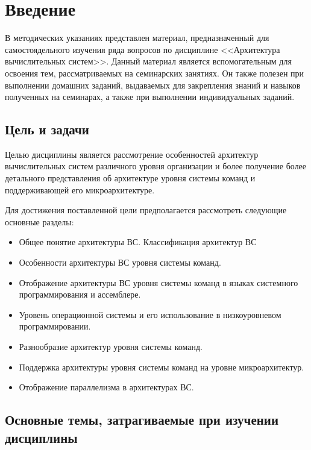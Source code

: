 
\chapter* {Введение}

В методических указаниях представлен материал, предназначенный для самостоядельного изучения ряда вопросов по дисциплине <<Архитектура вычислительных систем>>. Данный материал является вспомогательным для освоения тем, рассматриваемых на семинарских занятиях. Он также полезен при выполнении домашних заданий, выдаваемых для закрепления знаний и навыков полученных на семинарах, а также при выполнении индивидуальных заданий.

\section*{Цель и задачи}

Целью дисциплины является рассмотрение особенностей архитектур вычислительных систем различного уровня организации и более получение более детального представления об архитектуре уровня системы команд и поддерживающей его микроархитектуре.

Для достижения поставленной цели предполагается рассмотреть следующие основные разделы:

\begin{itemize}
 \item Общее понятие архитектуры ВС. Классификация архитектур ВС
 \item Особенности архитектуры ВС уровня системы команд.
 \item Отображение архитектуры ВС уровня системы команд в языках системного программирования и ассемблере.
 \item Уровень операционной системы и его использование в низкоуровневом программировании.
 \item Разнообразие архитектур уровня системы команд.
 \item Поддержка архитектуры уровня системы команд на уровне микроархитектур.
 \item Отображение параллелизма в архитектурах ВС.
\end{itemize}


\section*{Основные темы, затрагиваемые при изучении дисциплины}

